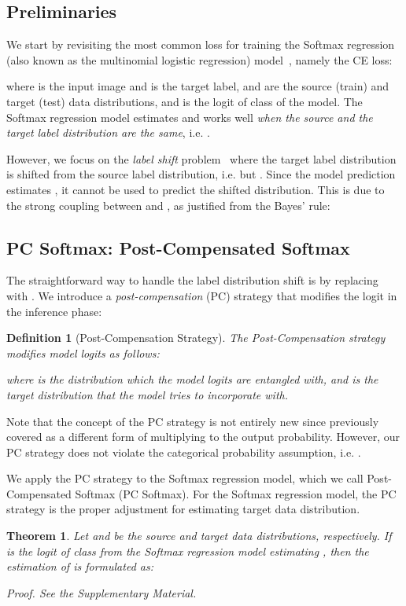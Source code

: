 \documentclass[final]{cvpr}
\newtheorem{theorem}{Theorem}
\newtheorem{definition}{Definition}[section]
\begin{document}
\subsection{Preliminaries}
We start by revisiting the most common loss for training the Softmax regression (also known as the multinomial logistic regression) model~\cite{bishop2006pattern}, namely the CE loss:

where  is the input image and  is the target label,  and  are the source (train) and target (test) data distributions, and  is the logit of class  of the model. 
The Softmax regression model estimates  and works well \textit{when the source and the target label distribution are the same}, i.e. .

However, we focus on the \textit{label shift} problem~\cite{garg2020unified,lipton2018detecting} where the target label distribution is shifted from the source label distribution, i.e.  but .
Since the model prediction estimates , it cannot be used to predict the shifted distribution.
This is due to the strong coupling between  and , as justified from the Bayes' rule:


\subsection{PC Softmax: Post-Compensated Softmax}\label{subsec:3_1_baseline}
The straightforward way to handle the label distribution shift is by replacing  with .
We introduce a \textit{post-compensation} (PC) strategy that modifies the logit in the inference phase:
\begin{definition}[Post-Compensation Strategy]
\label{def:pc_strategy}
The Post-Compensation strategy modifies model logits as follows:

where  is the distribution which the model logits are entangled with, and  is the target distribution that the model tries to incorporate with.
\end{definition}
Note that the concept of the PC strategy is not entirely new since \cite{margineantu2000does,buda2018systematic,johnson2019survey} previously covered as a different form of multiplying  to the output probability.
However, our PC strategy does not violate the categorical probability assumption, i.e. .

We apply the PC strategy to the Softmax regression model, which we call Post-Compensated Softmax (PC Softmax).
For the Softmax regression model, the PC strategy is the proper adjustment for estimating target data distribution.
\begin{theorem}
\label{thm:01_post_compensated_softmax}
 Let  and  be the source and target data distributions, respectively.
If  is the logit of class  from the Softmax regression model estimating , then the estimation of  is formulated as:

\textit{Proof.} See the Supplementary Material.
\end{theorem}
\end{document}
